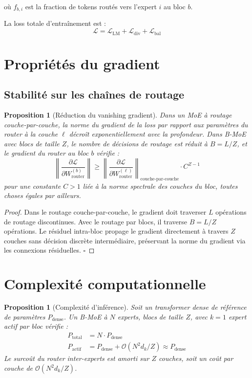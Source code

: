\documentclass[10pt,a4paper]{article}
\newtheorem{proposition}[theorem]{Proposition}
\begin{document}
où $f_{b,i}$ est la fraction de tokens routés vers l'expert $i$ au bloc $b$.

La loss totale d'entraînement est :
\begin{equation}
  \mathcal{L} = \mathcal{L}_{\text{LM}} + \mathcal{L}_{\text{div}} + \mathcal{L}_{\text{bal}}
\end{equation}

\section{Propriétés du gradient}

\subsection{Stabilité sur les chaînes de routage}

\begin{proposition}[Réduction du vanishing gradient]
Dans un MoE à routage couche-par-couche, la norme du gradient de la loss par rapport aux paramètres du router à la couche $\ell$ décroît exponentiellement avec la profondeur. Dans B-MoE avec blocs de taille $Z$, le nombre de décisions de routage est réduit à $B = L/Z$, et le gradient du router au bloc $b$ vérifie :
\begin{equation}
  \left\|\frac{\partial \mathcal{L}}{\partial W_{\text{router}}^{(b)}}\right\| \geq \left\|\frac{\partial \mathcal{L}}{\partial W_{\text{router}}^{(\ell)}}\right\|_{\text{couche-par-couche}} \cdot C^{Z-1}
\end{equation}
pour une constante $C > 1$ liée à la norme spectrale des couches du bloc, toutes choses égales par ailleurs.
\end{proposition}

\begin{proof}
Dans le routage couche-par-couche, le gradient doit traverser $L$ opérations de routage discontinues. Avec le routage par blocs, il traverse $B = L/Z$ opérations. Le résiduel intra-bloc propage le gradient directement à travers $Z$ couches sans décision discrète intermédiaire, préservant la norme du gradient via les connexions résiduelles. $\square$
\end{proof}

\section{Complexité computationnelle}

\begin{proposition}[Complexité d'inférence]
Soit un transformer dense de référence de paramètres $P_{\text{dense}}$. Un B-MoE à $N$ experts, blocs de taille $Z$, avec $k=1$ expert actif par bloc vérifie :
\begin{align}
  P_{\text{total}} &= N \cdot P_{\text{dense}} \\
  P_{\text{actif}} &= P_{\text{dense}} + \mathcal{O}(N^2 d_k / Z) \approx P_{\text{dense}}
\end{align}
Le surcoût du router inter-experts est amorti sur $Z$ couches, soit un coût par couche de $\mathcal{O}(N^2 d_k / Z)$.
\end{proposition}
\end{document}

